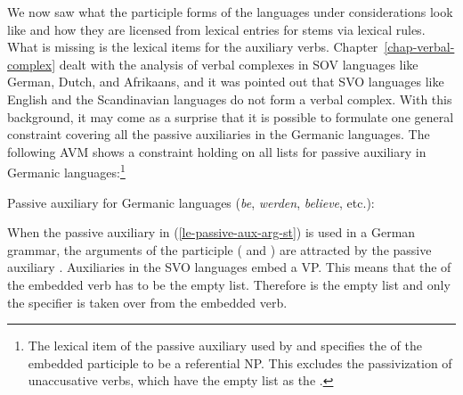 \largerpage
We now saw what the participle forms of the languages under considerations look like and how they are
licensed from lexical entries for stems via lexical rules. What is missing is the lexical items for
the auxiliary verbs. Chapter~\ref{chap-verbal-complex} dealt with the analysis of verbal complexes in SOV languages like
German, Dutch, and Afrikaans, and it was pointed out that SVO languages like English and the
Scandinavian languages do not form a verbal complex. With this background, it may come as a surprise
that it is possible to formulate one general constraint covering all the passive auxiliaries in the
Germanic languages. The following AVM shows a constraint holding on all \argst lists for passive
auxiliary in Germanic languages:\footnote{%
The lexical item of the passive auxiliary used by \citet[]{Mueller2002b} and \citet[]{MOe2013a}
specifies the \dav of the embedded participle to be a referential NP. This excludes the
passivization of unaccusative verbs, which have the empty list as the \dav.
}
 
\ea
\label{le-passive-aux-arg-st}
Passive auxiliary for Germanic languages (\emph{be}, \emph{werden}, \emph{believe}, etc.):\\
\z
%

\noindent
When the passive auxiliary in (\ref{le-passive-aux-arg-st}) is used in a German grammar, the
arguments of the participle ( and ) are attracted by the passive auxiliary
\citep{HN89a,HN94a}. 
Auxiliaries in the SVO languages embed a VP. This means that the \compsv of the embedded verb has to
be the empty list. Therefore  is the empty list and only the specifier  is taken
over from the embedded verb. 

